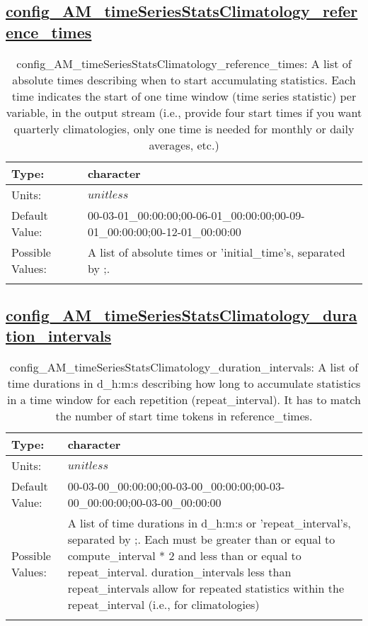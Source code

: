 \subsection[config\_AM\_timeSeriesStatsClimatology\_reference\_times]{\hyperref[sec:nm_tab_AM_timeSeriesStatsClimatology]{config\_AM\_timeSeriesStatsClimatology\_reference\_times}}
\label{subsec:nm_sec_config_AM_timeSeriesStatsClimatology_reference_times}
\begin{center}
\begin{longtable}{| p{2.0in} || p{4.0in} |}
    \hline
    Type: & character \\
    \hline
    Units: & $unitless$ \\
    \hline
    Default Value: & 00-03-01\_00:00:00;00-06-01\_00:00:00;00-09-01\_00:00:00;00-12-01\_00:00:00 \\
    \hline
    Possible Values: & A list of absolute times or 'initial\_time's, separated by ;. \\
    \hline
    \caption{config\_AM\_timeSeriesStatsClimatology\_reference\_times: A list of absolute times describing when to start accumulating statistics. Each time indicates the start of one time window (time series statistic) per variable, in the output stream (i.e., provide four start times if you want quarterly climatologies, only one time is needed for monthly or daily averages, etc.)}
\end{longtable}
\end{center}
\subsection[config\_AM\_timeSeriesStatsClimatology\_duration\_intervals]{\hyperref[sec:nm_tab_AM_timeSeriesStatsClimatology]{config\_AM\_timeSeriesStatsClimatology\_duration\_intervals}}
\label{subsec:nm_sec_config_AM_timeSeriesStatsClimatology_duration_intervals}
\begin{center}
\begin{longtable}{| p{2.0in} || p{4.0in} |}
    \hline
    Type: & character \\
    \hline
    Units: & $unitless$ \\
    \hline
    Default Value: & 00-03-00\_00:00:00;00-03-00\_00:00:00;00-03-00\_00:00:00;00-03-00\_00:00:00 \\
    \hline
    Possible Values: & A list of time durations in d\_h:m:s or 'repeat\_interval's, separated by ;. Each must be greater than or equal to compute\_interval * 2 and less than or equal to repeat\_interval. duration\_intervals less than repeat\_intervals allow for repeated statistics within the repeat\_interval (i.e., for climatologies) \\
    \hline
    \caption{config\_AM\_timeSeriesStatsClimatology\_duration\_intervals: A list of time durations in d\_h:m:s describing how long to accumulate statistics in a time window for each repetition (repeat\_interval). It has to match the number of start time tokens in reference\_times.}
\end{longtable}
\end{center}
